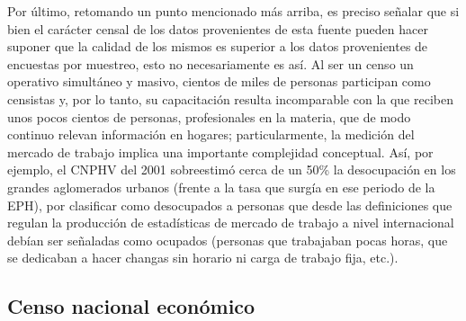 \documentclass[
  openany]{book}
\begin{document}
Por último, retomando un punto mencionado más arriba, es preciso señalar que si bien el carácter censal de los datos provenientes de esta fuente pueden hacer suponer que la calidad de los mismos es superior a los datos provenientes de encuestas por muestreo, esto no necesariamente es así.
Al ser un censo un operativo simultáneo y masivo, cientos de miles de personas participan como censistas y, por lo tanto, su capacitación resulta incomparable con la que reciben unos pocos cientos de personas, profesionales en la materia, que de modo continuo relevan información en hogares; particularmente, la medición del mercado de trabajo implica una importante complejidad conceptual.
Así, por ejemplo, el CNPHV del 2001 sobreestimó cerca de un 50\% la desocupación en los grandes aglomerados urbanos (frente a la tasa que surgía en ese periodo de la EPH), por clasificar como desocupados a personas que desde las definiciones que regulan la producción de estadísticas de mercado de trabajo a nivel internacional debían ser señaladas como ocupados (personas que trabajaban pocas horas, que se dedicaban a hacer changas sin horario ni carga de trabajo fija, etc.).

\hypertarget{censo-nacional-econuxf3mico}{%
\subsection{Censo nacional económico}\label{censo-nacional-econuxf3mico}}
\end{document}
